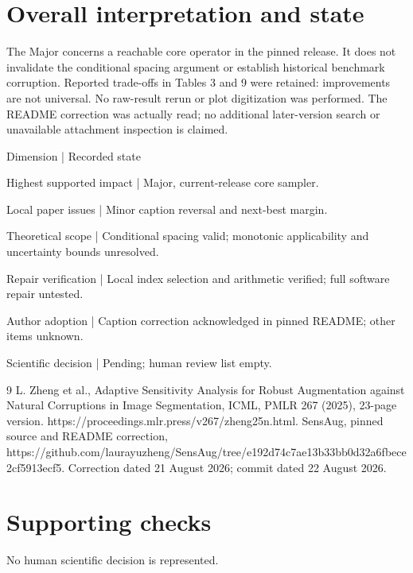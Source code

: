 \documentclass[10pt]{article}
\begin{document}
\section*{Overall interpretation and state}
The Major concerns a reachable core operator in the pinned release. It does not invalidate the conditional spacing argument or establish historical benchmark corruption. Reported trade-offs in Tables 3 and 9 were retained: improvements are not universal. No raw-result rerun or plot digitization was performed. The README correction was actually read; no additional later-version search or unavailable attachment inspection is claimed.\par
Dimension | Recorded state\par
Highest supported impact | Major, current-release core sampler.\par
Local paper issues | Minor caption reversal and next-best margin.\par
Theoretical scope | Conditional spacing valid; monotonic applicability and uncertainty bounds unresolved.\par
Repair verification | Local index selection and arithmetic verified; full software repair untested.\par
Author adoption | Caption correction acknowledged in pinned README; other items unknown.\par
Scientific decision | Pending; human review list empty.\par
9 L. Zheng et al., Adaptive Sensitivity Analysis for Robust Augmentation against Natural Corruptions in Image Segmentation, ICML, PMLR 267 (2025), 23-page version. https://proceedings.mlr.press/v267/zheng25n.html. SensAug, pinned source and README correction, https://github.com/laurayuzheng/SensAug/tree/e192d74c7ae13b33bb0d32a6fbece2cf5913ecf5. Correction dated 21 August 2026; commit dated 22 August 2026.\par
\section*{Supporting checks}
No human scientific decision is represented.\par
\end{document}
